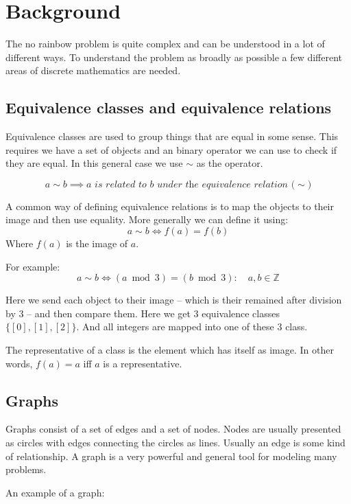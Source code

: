 \documentclass{article}
\begin{document}
\chapter{Background}
The no rainbow problem is quite complex and can be understood in a lot of different ways.
To understand the problem as broadly as possible a few different areas of discrete mathematics are needed.

\section{Equivalence classes and equivalence relations}
Equivalence classes are used to group things that are equal in some sense.
This requires we have a set of objects and an binary operator we can use to check if they are equal.
In this general case we use $\sim$ as the operator.

$$
  a \sim b \implies \textit{$a$ is related to $b$ under the equivalence relation ($\sim$)}
$$

A common way of defining equivalence relations is to map the objects to their image and then use equality.
More generally we can define it using:
$$
  a \sim b \iff f(a) = f(b)
$$
Where $f(a)$ is the image of $a$.

For example:
$$
  a \sim b \iff (a \bmod 3) = (b \bmod 3) : \quad a, b \in \mathds{Z}
$$

Here we send each object to their image -- which is their remained after division by 3 -- and then compare them.
Here we get 3 equivalence classes $\{[0], [1], [2]\}$. And all integers are mapped into one of these 3 class.

The representative of a class is the element which has itself as image. In other words, $f(a) = a$ iff $a$ is a representative.
\cite{sourceArmen} \cite{sourceAATA}

\section{Graphs}
Graphs consist of a set of edges and a set of nodes.
Nodes are usually presented as circles with edges connecting the circles as lines.
Usually an edge is some kind of relationship. 
A graph is a very powerful and general tool for modeling many problems.

An example of a graph:
\begin{center}
\end{center}
\end{document}
